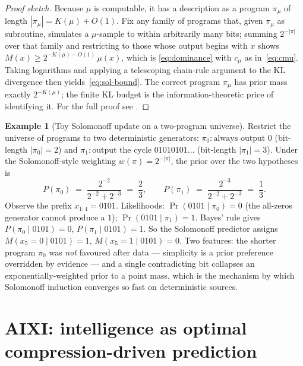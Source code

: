 \documentclass[12pt,a4paper]{article}
\theoremstyle{plain}
\theoremstyle{definition}
\newtheorem{example}[theorem]{Example}
\begin{document}
\begin{proof}[Proof sketch]
Because $\mu$ is computable, it has a description as a program
$\pi_\mu$ of length $|\pi_\mu| = K(\mu) + O(1)$.  Fix any family of
programs that, given $\pi_\mu$ as subroutine, simulates a $\mu$-sample
to within arbitrarily many bits; summing $2^{-|\pi|}$ over that
family and restricting to those whose output begins with $x$ shows
$M(x) \ge 2^{-K(\mu) - O(1)}\,\mu(x)$, which is
\eqref{eq:dominance} with $c_\mu$ as in~\eqref{eq:cmu}.  Taking
logarithms and applying a telescoping chain-rule argument to the KL
divergence then yields~\eqref{eq:sol-bound}.  The correct program
$\pi_\mu$ has prior mass exactly $2^{-K(\mu)}$; the finite KL budget
is the information-theoretic price of identifying it.  For the full
proof see \citet[Ch.~5]{livitanyi2019}.
\end{proof}

\begin{example}[Toy Solomonoff update on a two-program universe]
\label{ex:toy-solomonoff}
Restrict the universe of programs to two deterministic generators:
$\pi_0 : \text{always output }0$ (bit-length $|\pi_0| = 2$) and
$\pi_1 : \text{output the cycle } 01010101\ldots$ (bit-length
$|\pi_1| = 3$).  Under the Solomonoff-style weighting
$w(\pi) = 2^{-|\pi|}$, the prior over the two hypotheses is
\[
  P(\pi_0) \;=\; \frac{2^{-2}}{2^{-2} + 2^{-3}} \;=\; \frac{2}{3},
  \qquad
  P(\pi_1) \;=\; \frac{2^{-3}}{2^{-2} + 2^{-3}} \;=\; \frac{1}{3}.
\]
Observe the prefix $x_{1:4} = 0101$.  Likelihoods:
$\Pr(0101 \mid \pi_0) = 0$ (the all-zeros generator cannot produce a
$1$); $\Pr(0101 \mid \pi_1) = 1$.  Bayes' rule gives
$P(\pi_0 \mid 0101) = 0$, $P(\pi_1 \mid 0101) = 1$.  So the Solomonoff
predictor assigns $M(x_5 = 0 \mid 0101) = 1$, $M(x_5 = 1 \mid 0101) =
0$.  Two features: the shorter program $\pi_0$ was \emph{not}
favoured after data --- simplicity is a prior preference overridden
by evidence --- and a single contradicting bit collapses an
exponentially-weighted prior to a point mass, which is the mechanism
by which Solomonoff induction converges so fast on deterministic
sources.
\end{example}

\section{AIXI: intelligence as optimal compression-driven prediction}
\label{sec:aixi}
\end{document}
